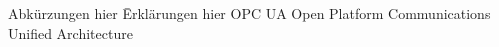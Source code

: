 \begin{tabbing}
    Abkürzungen hier \= Erklärungen hier \kill
    OPC UA \> Open Platform Communications Unified Architecture
\end{tabbing}